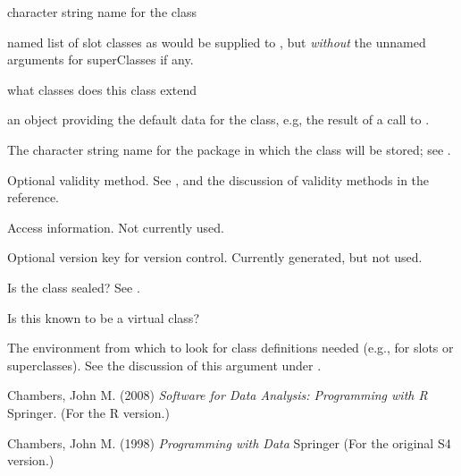 \begin{Arguments}
\begin{ldescription}
\item[\code{name}] character string name for the class
\item[\code{slots}] named list of slot classes as would be supplied to
, but \emph{without} the unnamed arguments for
superClasses if any.
\item[\code{superClasses}] what classes does this class extend
\item[\code{prototype}] an object providing the default data for the class,
e.g, the result of a call to .
\item[\code{package}] The character string name for the package in which
the class will be stored; see .
\item[\code{validity}] Optional validity method.  See
, and the discussion of validity methods in
the reference.
\item[\code{access}] Access information.  Not currently used.
\item[\code{version}] Optional version key for version control.  Currently
generated, but not used.
\item[\code{sealed}] Is the class sealed? See .
\item[\code{virtual}] Is this known to be a virtual class?

\item[\code{where}] The environment from which to look for class
definitions needed (e.g., for slots or superclasses). See the
discussion of this argument under .
\end{ldescription}
\end{Arguments}
%
\begin{References}\relax
Chambers, John M. (2008)
\emph{Software for Data Analysis: Programming with R}
Springer.  (For the R version.)

Chambers, John M. (1998)
\emph{Programming with Data}
Springer (For the original S4 version.)
\end{References}
%
\begin{SeeAlso}\relax
{}
\end{SeeAlso}
